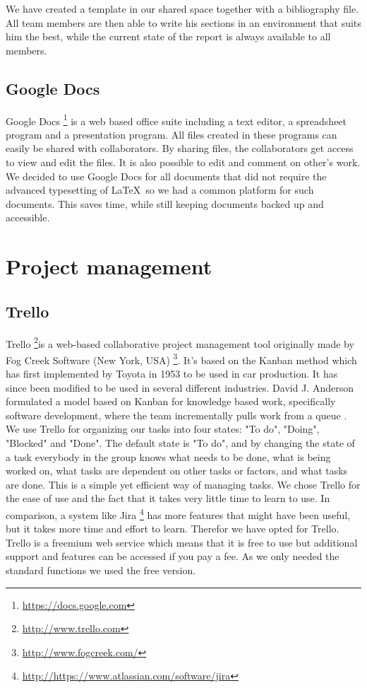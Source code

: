 \documentclass[11pt,a4paper,titlepage,oneside]{report}
\begin{document}
 We have created a template in our shared space together with a bibliography file. All team members are then able to write his sections in an environment that suits him the best, while the current state of the report is always available to all members.

  \subsection{Google Docs}
  Google Docs \footnote{\url{https://docs.google.com}} is a web based office suite including a text editor, a spreadsheet program and a presentation program. All files created in these programs can easily be shared with collaborators. By sharing files, the collaborators get access to view and edit the files. It is also possible to edit and comment on other's work. We decided to use Google Docs for all documents that did not require the advanced typesetting of \LaTeX~so we had a common platform for such documents. This saves time, while still keeping documents backed up and accessible. 

\section{Project management}
  \subsection{Trello}
  \label{subsec:Trello}
  Trello \footnote{\url{http://www.trello.com}}is a web-based collaborative project management tool originally made by Fog Creek Software (New York, USA) \footnote{\url{http://www.fogcreek.com/}}. 
It's based on the Kanban method which has first implemented by Toyota in 1953 to be used in car production. It has since been modified to be used in several different industries. 
David J. Anderson formulated a model based on Kanban for knowledge based work, specifically software development, where the team incrementally pulls work from a queue \cite{da2004}. 
We use Trello for organizing our tasks into four states: "To do", "Doing", "Blocked" and "Done". The default state is "To do", and by changing the state of a task everybody in the group knows what needs to be done, what is being worked on, what tasks are dependent on other tasks or factors, and what tasks are done.
This is a simple yet efficient way of managing tasks. We chose Trello for the ease of use and the fact that it takes very little time to learn to use. In comparison, a system like Jira \footnote{\url{http://https://www.atlassian.com/software/jira}} has more features that might have been useful, but it takes more time and effort to learn. Therefor we have opted for Trello.
Trello is a freemium web service which means that it is free to use but additional support and features can be accessed if you pay a fee. As we only needed the standard functions we used the free version.
\end{document}
